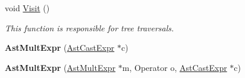 \begin{DoxyCompactItemize}
\item 
void \hyperlink{classAstMultExpr_aea6419ae54b97e882c9a9ab79ca73529}{Visit} ()
\begin{DoxyCompactList}\small\item\em This function is responsible for tree traversals. \end{DoxyCompactList}\item 
\hypertarget{classAstMultExpr_a5ff1c515cad4ae7084d44d7663a937bc}{{\bfseries Ast\-Mult\-Expr} (\hyperlink{classAstCastExpr}{Ast\-Cast\-Expr} $\ast$c)}\label{classAstMultExpr_a5ff1c515cad4ae7084d44d7663a937bc}

\item 
\hypertarget{classAstMultExpr_a1ef684e47bbad3aa857098807a16ee00}{{\bfseries Ast\-Mult\-Expr} (\hyperlink{classAstMultExpr}{Ast\-Mult\-Expr} $\ast$m, Operator o, \hyperlink{classAstCastExpr}{Ast\-Cast\-Expr} $\ast$c)}\label{classAstMultExpr_a1ef684e47bbad3aa857098807a16ee00}


\end{DoxyCompactItemize}
